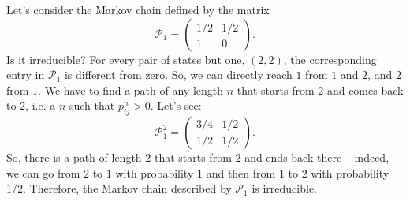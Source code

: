 Let’s consider the Markov chain defined by the matrix
\begin{equation}
  \mathcal{P}_{1} =
  \begin{pmatrix}
    1/2 & 1/2 \\
    1  &  0
  \end{pmatrix}.
\end{equation}
Is it irreducible? For every pair of states but one, $(2, 2)$, the corresponding
entry in $\mathcal{P}_1$ is different from zero. So, we can directly reach $1$
from $1$ and $2$, and $2$ from $1$. We have to find a path of any length $n$
that starts from $2$ and comes back to $2$, i.e. a $n$ such that $p^{n}_{ij} >
0$. Let’s see:
\begin{equation}
  \mathcal{P}_{1}^{2} =
  \begin{pmatrix}
    3/4 & 1/2 \\
    1/2 & 1/2
  \end{pmatrix}.
\end{equation}
So, there is a path of length $2$ that starts from $2$ and ends back there –
indeed, we can go from $2$ to $1$ with probability $1$ and then from $1$ to $2$
with probability $1/2$. Therefore, the Markov chain described by $\mathcal{P}_1$
is irreducible.

